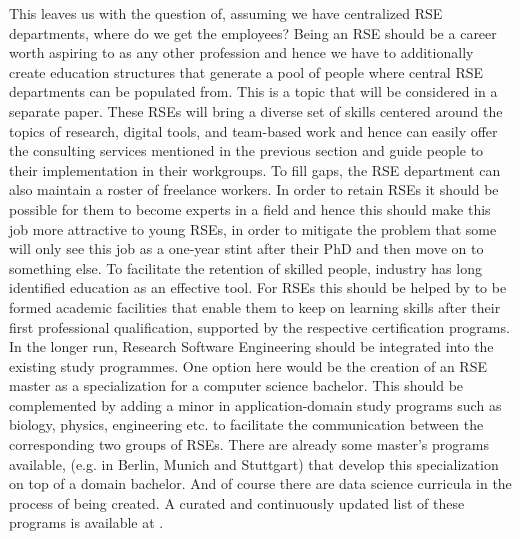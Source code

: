 \documentclass[a4paper]{article}
\makeatletter
\newcommand*{\eg}{e.g.\@\xspace}
\makeatother
\begin{document}
This leaves us with the question of, assuming we have centralized RSE departments, where do we get the employees?
Being an RSE should be a career worth aspiring to as any other profession and hence we have to additionally create education structures that generate a pool of people where central RSE departments can be populated from.
This is a topic that will be considered in a separate paper.
These RSEs will bring a diverse set of skills centered around the topics of research, 
digital tools, and team-based work and hence can easily offer the consulting services mentioned in the previous section and guide people to their implementation in their workgroups.
To fill gaps, the RSE department can also maintain a roster of freelance workers.
In order to retain RSEs it should be possible for them to become experts in a field and hence this should make this job more attractive to young RSEs,
in order to mitigate the problem that some will only see this job as a one-year stint after their PhD and then move on to something else.
To facilitate the retention of skilled people, industry has long identified education as an effective tool.
For RSEs this should be helped by to be formed academic facilities that enable them to keep on learning skills after their first professional qualification, supported by the respective certification programs.
In the longer run, Research Software Engineering should be integrated into the existing study programmes.
One option here would be the creation of an RSE master as a specialization for a computer science bachelor.
This should be complemented by adding a minor in application-domain study programs such as biology, physics, engineering etc. to facilitate the communication between the corresponding two groups of RSEs.
There are already some master's programs available, (\eg in Berlin, Munich and Stuttgart) that develop this specialization on top of a domain bachelor.
And of course there are data science curricula in the process of being created. A curated and continuously updated list of these programs is available at \cite{learnandteachlearn}.

\printbibliography[heading=bibintoc]
\end{document}
